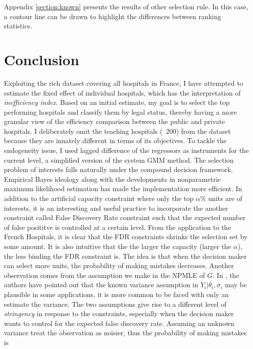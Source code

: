 \documentclass[12pt]{article}
\begin{document}
Appendix \ref{section:known} presents the results of other selection rule. In
this case, a contour line can be drawn to highlight the differences between
ranking statistics.

\section{Conclusion}

Exploiting the rich dataset covering all hospitals in France, I have attempted
to estimate the fixed effect of individual hospitals, which has the
interpretation of \textit{inefficiency index}. Based on an initial estimate, my
goal is to select the top performing hospitals and classify them by legal
status, thereby having a more granular view of the efficiency comparison
between the public and private hospitals. I deliberately omit the teaching
hospitals (~200) from the dataset because they are innately different in terms
of its objectives. To tackle the endogeneity issue, I used lagged difference of
the regressors as instruments for the current level, a simplified version of
the system GMM method. The selection problem of interests falls naturally under
the compound decision framework. Empirical Bayes ideology along with the
developments in nonparametric maximum likelihood estimation has made the
implementation more efficient. In addition to the artificial capacity
constraint where only the top $\alpha\%$ units are of interests, it is an
interesting and useful practice to incorporate the another constraint called
False Discovery Rate constraint such that the expected number of false
posititve is controlled at a certain level. From the application to the French
Hospitals, it is clear that the FDR constraints shrinks the selection set by
some amount. It is also intuitive that the the larger the capacity (larger the
$\alpha$), the less binding the FDR constraint is. The idea is that when the
decision maker can select more units, the probability of making mistakes
decreases. Another observation comes from the assumption we make in the NPMLE
of $G$. In \citet{gu2023invidious}, the authors have pointed out that the known
variance assumption in $Y_i|\theta_i,\sigma_i$ may be plausible in some
applications, it is more common to be faced with only an estimate the variance.
The two assumptions give rise to a different level of \textit{stringency} in
response to the constraints, especially when the decision maker wants to
control for the expected false discovery rate. Assuming an unknown variance
treat the observation as noisier, thus the probability of making mistakes is
\end{document}
